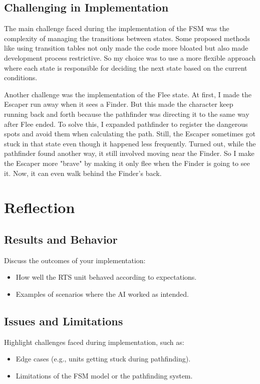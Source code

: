 \documentclass[a4paper,12pt]{article}
\begin{document}
\subsection{Challenging in Implementation}
The main challenge faced during the implementation of the FSM was the complexity of managing the transitions between states.
Some proposed methods like using transition tables not only made the code more bloated but also made development process restrictive.
So my choice was to use a more flexible approach where each state is responsible for deciding the next state based on the current conditions.

Another challenge was the implementation of the Flee state. 
At first, I made the Escaper run away when it sees a Finder.
But this made the character keep running back and forth because the pathfinder was directing it to the same way after Flee ended.
To solve this, I expanded pathfinder to register the dangerous spots and avoid them when calculating the path.
Still, the Escaper sometimes got stuck in that state even though it happened less frequently.
Turned out, while the pathfinder found another way, it still involved moving near the Finder.
So I make the Escaper more "brave" by making it only flee when the Finder is going to see it.
Now, it can even walk behind the Finder's back.



\section{Reflection}
\subsection{Results and Behavior}
Discuss the outcomes of your implementation:
\begin{itemize}
    \item How well the RTS unit behaved according to expectations.
    \item Examples of scenarios where the AI worked as intended.
\end{itemize}

\subsection{Issues and Limitations}
Highlight challenges faced during implementation, such as:
\begin{itemize}
    \item Edge cases (e.g., units getting stuck during pathfinding).
    \item Limitations of the FSM model or the pathfinding system.
\end{itemize}
\end{document}
